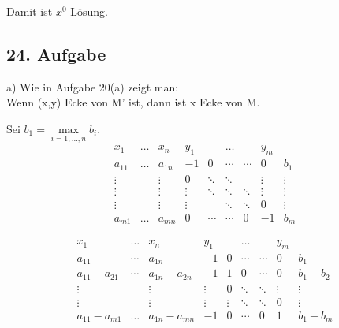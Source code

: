 \documentclass[a4paper,11pt,twoside,titlepage]{article}
\begin{document}
Damit ist $x^0$ Lösung.

\subsection*{24. Aufgabe}
a) Wie in Aufgabe 20(a) zeigt man:\\
Wenn (x,y) Ecke von M' ist, dann ist x Ecke von M.

Sei $b_1=\max\limits_{i=1,\ldots,n}b_i$.
\[\begin{array}{cccccccc|c}
x_1&\ldots&x_n&y_1&&\ldots&&y_m&\\\hline
a_{11}&\ldots&a_{1n}&-1&0&\cdots&\cdots&0&b_1\\
\vdots&&\vdots&0&\ddots&\ddots&&\vdots&\vdots\\
\vdots&&\vdots&\vdots&\ddots&\ddots&\ddots&\vdots&\vdots\\
\vdots&&\vdots&\vdots&&\ddots&\ddots&0&\vdots\\
a_{m1}&\ldots&a_{mn}&0&\cdots&\cdots&0&-1&b_m
\end{array}\]

\[\begin{array}{cccccccc|c}
x_1&\ldots&x_n&y_1&&\ldots&&y_m&\\\hline
a_{11}&\cdots&a_{1n}&-1&0&\cdots&\cdots&0&b_1\\
a_{11}-a_{21}&\cdots&a_{1n}-a_{2n}&-1&1&0&\cdots&0&b_1-b_2\\
\vdots&&\vdots&\vdots&0&\ddots&\ddots&\vdots&\vdots\\
\vdots&&\vdots&\vdots&\vdots&\ddots&\ddots&0&\vdots\\
a_{11}-a_{m1}&\ldots&a_{1n}-a_{mn}&-1&0&\cdots&0&1&b_1-b_m
\end{array}\]
\end{document}
